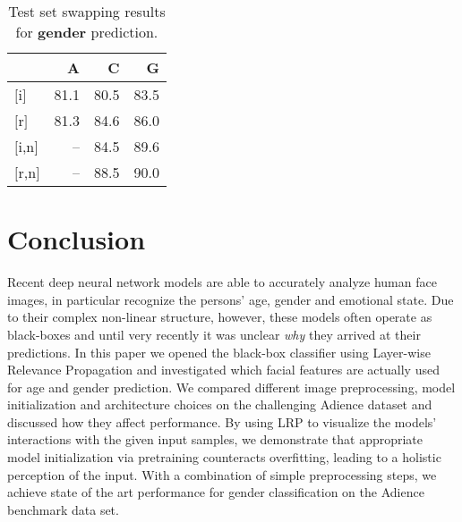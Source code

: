 \documentclass[10pt,twocolumn,letterpaper]{article}
\begin{document}
\begin{table}
\begin{center}
\begin{tabular}{l|rrr}
	& \textbf{A} & \textbf{C} & \textbf{G}\\
\hline
	 $[$i$]$ 		& 81.1	& 80.5	& 83.5\\
	 $[$r$]$ 		& 81.3 	& 84.6 	& 86.0\\
	 \hline
	 $[$i,n$]$ 	& -- 	& 84.5 	& 89.6 \\
	 $[$r,n$]$ 	& --	& 88.5 	& 90.0 \\
\hline
\end{tabular}
\end{center}
	\caption{
	Test set swapping results for \textbf{gender} prediction.
	}
	\label{tab:genderresultsopposite}
\end{table}




\section{Conclusion}
Recent deep neural network models are able to accurately analyze human face images, in particular recognize the persons' age, gender and emotional state.
Due to their complex non-linear structure, however, these models often operate as black-boxes and until very recently it was unclear {\it why} they arrived at their predictions.
In this paper we opened the black-box classifier using Layer-wise Relevance Propagation and investigated which facial features are actually used for age and gender prediction.
We compared different image preprocessing, model initialization and architecture choices on the challenging Adience dataset and discussed how they affect performance.
By using LRP to visualize the models' interactions with the given input samples, we demonstrate that appropriate model initialization via pretraining counteracts overfitting, leading to a holistic perception of the input.
With a combination of simple preprocessing steps, we achieve state of the art performance for gender classification on the Adience benchmark data set.

{\small


}
\end{document}
